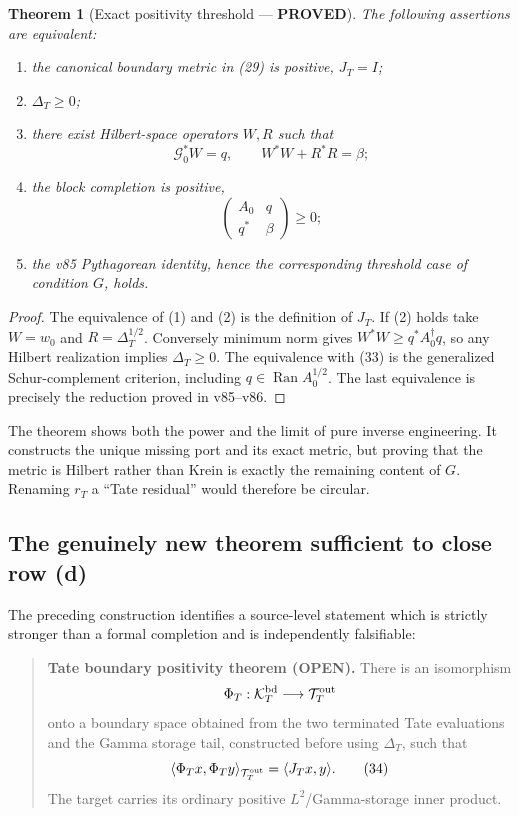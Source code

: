 \documentclass[11pt]{article}
\newtheorem{theorem}{Theorem}
\newcommand{\PROVED}{\textcolor{green!45!black}{\textbf{PROVED}}}
\newcommand{\Ran}{\operatorname{Ran}}
\begin{document}
\begin{theorem}[Exact positivity threshold --- \PROVED]
The following assertions are equivalent:
\begin{enumerate}
\item the canonical boundary metric in (29) is positive, $J_T=I$;
\item $\Delta_T\ge0$;
\item there exist Hilbert-space operators $W,R$ such that
\[
 \mathcal G_0^*W=q,
 \qquad W^*W+R^*R=\beta;
\]
\item the block completion is positive,
\begin{equation}
 \begin{pmatrix}A_0&q\\q^*&\beta\end{pmatrix}\ge0;      \tag{33}
\end{equation}
\item the v85 Pythagorean identity, hence the corresponding threshold case of
condition $G$, holds.
\end{enumerate}
\end{theorem}

\begin{proof}
The equivalence of (1) and (2) is the definition of $J_T$.  If (2) holds take
$W=w_0$ and $R=\Delta_T^{1/2}$.  Conversely minimum norm gives
$W^*W\ge q^*A_0^\dagger q$, so any Hilbert realization implies
$\Delta_T\ge0$.  The equivalence with (33) is the generalized Schur-complement
criterion, including $q\in\Ran A_0^{1/2}$.  The last equivalence is precisely
the reduction proved in v85--v86.
\end{proof}

The theorem shows both the power and the limit of pure inverse engineering.
It constructs the unique missing port and its exact metric, but proving that
the metric is Hilbert rather than Krein is exactly the remaining content of
$G$.  Renaming $r_T$ a ``Tate residual'' would therefore be circular.

\subsection{The genuinely new theorem sufficient to close row (d)}

The preceding construction identifies a source-level statement which is
strictly stronger than a formal completion and is independently falsifiable:

\begin{quote}
\textbf{Tate boundary positivity theorem (OPEN).}
There is an isomorphism
\[
 \Phi_T:\mathcal K_T^{\rm bd}\longrightarrow
 \mathcal T_T^{\rm out}
\]
onto a boundary space obtained from the two terminated Tate evaluations and
the Gamma storage tail, constructed before using $\Delta_T$, such that
\begin{equation}
 \langle\Phi_Tx,\Phi_Ty\rangle_{\mathcal T_T^{\rm out}}
 =\langle J_Tx,y\rangle.                                \tag{34}
\end{equation}
The target carries its ordinary positive $L^2$/Gamma-storage inner product.
\end{quote}
\end{document}
